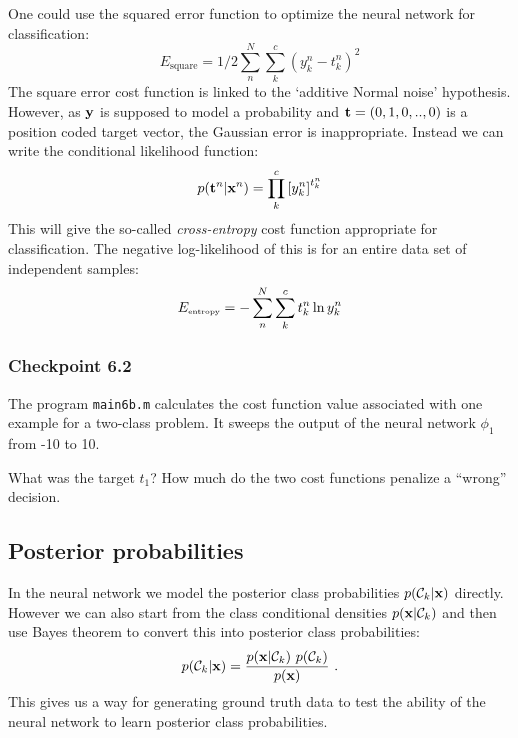 \documentclass[12pt]{article}    %
\def\x{{\bf x}}
\begin{document}
One could use the squared error function  to optimize
the neural network for classification:
\begin{equation}
  \label{eq:square}
  E_{\text{square}} = 1/2 \sum_n^N \sum_k^c (y_k^n - t_k^n)^2
\end{equation}
The square error cost function is linked to the `additive Normal noise' hypothesis.
However, as ${\bf y}$ is supposed to model a probability and ${\bf t} = (0,1,0,..,0)$
is a position coded target vector,  the Gaussian
error is inappropriate. Instead 
we can write the conditional likelihood function:
\begin{equation}
  \label{eq:multinom}
  p({\bf t}^n|{\bf x}^n) =
   \prod_k^c \left[{y_k^n}\right]^{t_k^n}
\end{equation}
This will give the so-called {\em cross-entropy} cost function appropriate for classification.
The negative log-likelihood of this is for an entire data set of
independent samples:
\begin{equation}
  \label{eq:multipleentropy}
  E_{\mbox{\tiny entropy}} = -\sum_n^N \sum_k^c
   t_k^n \ln y_k^n
\end{equation}
\iffalse
For a two-class problem with just a single output this can also be
written as:
\begin{equation}
  \label{eq:twoentropy}
  E_{\mbox{\tiny entropy}} = -\sum_n^N
  \left[ t_k^n \ln y_k^n + (1-t_k^n) \ln (1-y_k^n) \right]
\end{equation}
\fi


\subsubsection*{Checkpoint 6.2}

The program {\tt main6b.m} calculates the cost function value associated
with one example for a two-class problem.
It sweeps the output of the neural network $\phi_1$ from -10 to 10.

What was the target $t_1$? How much do the two cost functions penalize a
``wrong'' decision.


\subsection*{Posterior probabilities}

In the neural network we model the posterior class probabilities $p({\cal C}_k|\x) $ directly. However we can also start from the class conditional densities $p(\x|{\cal C}_k)$ and then use Bayes theorem to convert this into posterior class probabilities: 
\begin{equation}
  \label{eq:posterior}
  p({\cal C}_k|\x) = \frac{p(\x|{\cal C}_k)\ p({\cal C}_k)}{p(\x)} \ .
\end{equation}
This gives us a way for generating ground truth data to test the ability of the neural network to learn posterior class probabilities. 
\end{document}
